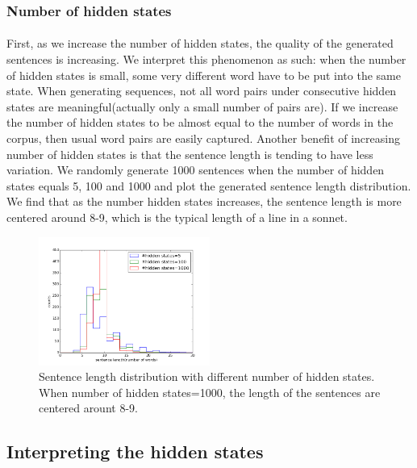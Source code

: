 %
\vspace{5pt}
\subsubsection{Number of hidden states}
\vspace{5pt}
\paragraph{} First, as we increase the number of hidden states, the quality of the generated sentences is increasing. We interpret this phenomenon as such: when the number of hidden states is small, some very different word have to be put into the same state. When generating sequences, not all word pairs under consecutive hidden states are meaningful(actually only a small number of pairs are). If we increase the number of hidden states to be almost equal to the number of words in the corpus, then usual word pairs are easily captured. Another benefit of increasing number of hidden states is that the sentence length is tending to have less variation. We randomly generate 1000 sentences when the number of hidden states equals 5, 100 and 1000 and plot the generated sentence length distribution. We find that as the number hidden states increases, the sentence length is more centered around 8-9, which is the typical length of a line in a sonnet.
 \begin{figure}[h!]
 \centering
 \includegraphics[width=0.5\textwidth]{./figure/hiddenstate_len_distri.png}
 \caption{Sentence length distribution with different number of hidden states. When number of hidden states=1000, the length of the sentences are centered arount 8-9.}
 \end{figure}
\vspace{5pt}
\subsection{Interpreting the hidden states}
\vspace{5pt}

